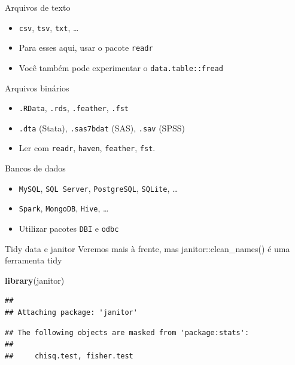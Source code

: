 \documentclass[
  10pt,
  ignorenonframetext,
]{beamer}
\newenvironment{Shaded}{\begin{snugshade}}{\end{snugshade}}
\newcommand{\KeywordTok}[1]{\textcolor[rgb]{0.13,0.29,0.53}{\textbf{#1}}}
\newcommand{\NormalTok}[1]{#1}
\begin{document}
\begin{frame}[fragile]{Arquivos de texto}
\protect\hypertarget{arquivos-de-texto}{}
\begin{itemize}
\item
  \texttt{csv}, \texttt{tsv}, \texttt{txt}, \ldots{}
\item
  Para esses aqui, usar o pacote \texttt{readr}
\item
  Você também pode experimentar o \texttt{data.table::fread}
\end{itemize}
\end{frame}

\begin{frame}[fragile]{Arquivos binários}
\protect\hypertarget{arquivos-binuxe1rios}{}
\begin{itemize}
\item
  \texttt{.RData}, \texttt{.rds}, \texttt{.feather}, \texttt{.fst}
\item
  \texttt{.dta} (Stata), \texttt{.sas7bdat} (SAS), \texttt{.sav} (SPSS)
\item
  Ler com \texttt{readr}, \texttt{haven}, \texttt{feather},
  \texttt{fst}.
\end{itemize}
\end{frame}

\begin{frame}[fragile]{Bancos de dados}
\protect\hypertarget{bancos-de-dados}{}
\begin{itemize}
\item
  \texttt{MySQL}, \texttt{SQL\ Server}, \texttt{PostgreSQL},
  \texttt{SQLite}, \ldots{}
\item
  \texttt{Spark}, \texttt{MongoDB}, \texttt{Hive}, \ldots{}
\item
  Utilizar pacotes \texttt{DBI} e \texttt{odbc}
\end{itemize}
\end{frame}

\begin{frame}[fragile]{Tidy data e janitor}
\protect\hypertarget{tidy-data-e-janitor}{}
Veremos mais à frente, mas janitor::clean\_names() é uma ferramenta tidy

\begin{Shaded}
\begin{Highlighting}[]
\KeywordTok{library}\NormalTok{(janitor)}
\end{Highlighting}
\end{Shaded}

\begin{verbatim}
## 
## Attaching package: 'janitor'
\end{verbatim}

\begin{verbatim}
## The following objects are masked from 'package:stats':
## 
##     chisq.test, fisher.test
\end{verbatim}
\end{frame}
\end{document}
